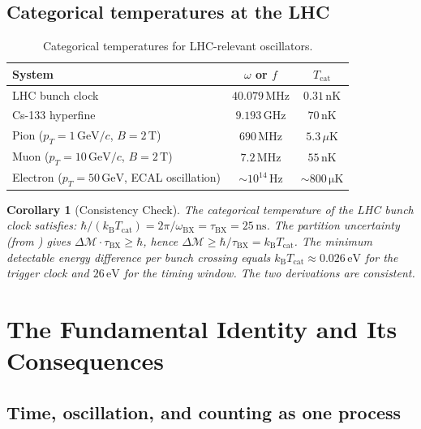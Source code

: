 \documentclass[twocolumn,10pt,a4paper]{article}
\theoremstyle{thmstyle}
\newtheorem{corollary}[theorem]{Corollary}
\theoremstyle{definition}
\theoremstyle{remark}
\newcommand{\kB}{k_{\mathrm{B}}}
\begin{document}
\subsection{Categorical temperatures at the LHC}
\label{sec:temperatures}

\begin{table}[h]
\centering\small
\caption{Categorical temperatures for LHC-relevant oscillators.}
\label{tab:temperatures}
\begin{tabular}{lcc}
\toprule
System & $\omega$ or $f$ & $T_{\mathrm{cat}}$ \\
\midrule
LHC bunch clock & $40.079\,\mathrm{MHz}$ & $0.31\,\mathrm{nK}$ \\
Cs-133 hyperfine & $9.193\,\mathrm{GHz}$ & $70\,\mathrm{nK}$ \\
Pion ($p_T = 1\,\mathrm{GeV}/c$, $B = 2\,\mathrm{T}$) & $690\,\mathrm{MHz}$ & $5.3\,\mu\mathrm{K}$ \\
Muon ($p_T = 10\,\mathrm{GeV}/c$, $B = 2\,\mathrm{T}$) & $7.2\,\mathrm{MHz}$ & $55\,\mathrm{nK}$ \\
Electron ($p_T = 50\,\mathrm{GeV}$, ECAL oscillation) & $\sim 10^{14}\,\mathrm{Hz}$ & $\sim 800\,\mathrm{\mu K}$ \\
\bottomrule
\end{tabular}
\end{table}

\begin{corollary}[Consistency Check]
\label{cor:consistency}
The categorical temperature of the LHC bunch clock satisfies:
$\hbar/(\kB T_{\mathrm{cat}}) = 2\pi/\omega_{\mathrm{BX}} = \tau_{\mathrm{BX}} = 25\,\mathrm{ns}$.
The partition uncertainty (from \citealt{companion:planck}) gives
$\Delta\mathcal{M} \cdot \tau_{\mathrm{BX}} \geq \hbar$,
hence $\Delta\mathcal{M} \geq \hbar/\tau_{\mathrm{BX}} = \kB T_{\mathrm{cat}}$.
The minimum detectable energy difference per bunch crossing equals
$\kB T_{\mathrm{cat}} \approx 0.026\,\mathrm{eV}$ for the trigger clock
and $26\,\mathrm{eV}$ for the timing window.
The two derivations are consistent.
\end{corollary}

\section{The Fundamental Identity and Its Consequences}
\label{sec:fundamental}

\subsection{Time, oscillation, and counting as one process}
\end{document}
